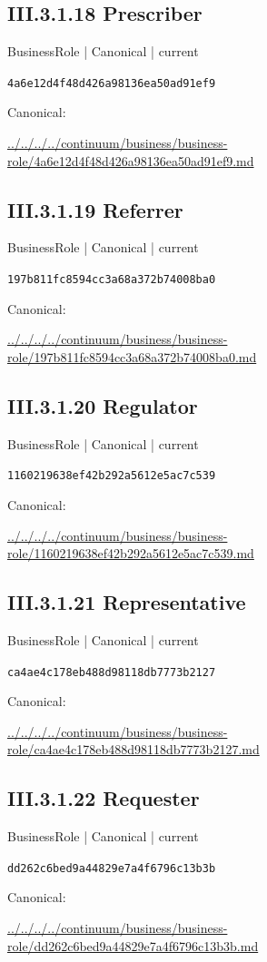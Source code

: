 \documentclass[10pt,a4paper]{article}
\begin{document}
\subsection*{III.3.1.18 Prescriber}
{\small BusinessRole | Canonical | current}\par
\texttt{4a6e12d4f48d426a98136ea50ad91ef9}\par
Canonical: \par
{\footnotesize\url{../../../../continuum/business/business-role/4a6e12d4f48d426a98136ea50ad91ef9.md}}\par
\subsection*{III.3.1.19 Referrer}
{\small BusinessRole | Canonical | current}\par
\texttt{197b811fc8594cc3a68a372b74008ba0}\par
Canonical: \par
{\footnotesize\url{../../../../continuum/business/business-role/197b811fc8594cc3a68a372b74008ba0.md}}\par
\subsection*{III.3.1.20 Regulator}
{\small BusinessRole | Canonical | current}\par
\texttt{1160219638ef42b292a5612e5ac7c539}\par
Canonical: \par
{\footnotesize\url{../../../../continuum/business/business-role/1160219638ef42b292a5612e5ac7c539.md}}\par
\subsection*{III.3.1.21 Representative}
{\small BusinessRole | Canonical | current}\par
\texttt{ca4ae4c178eb488d98118db7773b2127}\par
Canonical: \par
{\footnotesize\url{../../../../continuum/business/business-role/ca4ae4c178eb488d98118db7773b2127.md}}\par
\subsection*{III.3.1.22 Requester}
{\small BusinessRole | Canonical | current}\par
\texttt{dd262c6bed9a44829e7a4f6796c13b3b}\par
Canonical: \par
{\footnotesize\url{../../../../continuum/business/business-role/dd262c6bed9a44829e7a4f6796c13b3b.md}}\par
\end{document}
